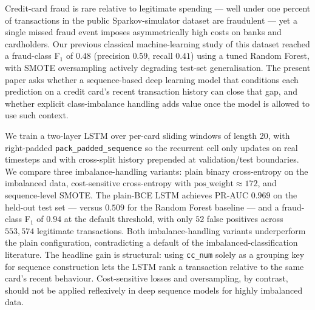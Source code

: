\documentclass[oneside,12pt,parskip=half,american,numbers=noenddot]{scrreprt}
\begin{document}
Credit-card fraud is rare relative to legitimate spending — well under one percent of transactions in the public Sparkov-simulator dataset are fraudulent — yet a single missed fraud event imposes asymmetrically high costs on banks and cardholders. Our previous classical machine-learning study of this dataset reached a fraud-class F\(_1\) of $0.48$ (precision $0.59$, recall $0.41$) using a tuned Random Forest, with SMOTE oversampling actively degrading test-set generalisation. The present paper asks whether a sequence-based deep learning model that conditions each prediction on a credit card's recent transaction history can close that gap, and whether explicit class-imbalance handling adds value once the model is allowed to use such context.

We train a two-layer LSTM over per-card sliding windows of length 20, with right-padded \texttt{pack\_padded\_sequence} so the recurrent cell only updates on real timesteps and with cross-split history prepended at validation/test boundaries. We compare three imbalance-handling variants: plain binary cross-entropy on the imbalanced data, cost-sensitive cross-entropy with $\text{pos\_weight} \approx 172$, and sequence-level SMOTE. The plain-BCE LSTM achieves PR-AUC $0.969$ on the held-out test set — versus $0.509$ for the Random Forest baseline — and a fraud-class F\(_1\) of $0.94$ at the default threshold, with only $52$ false positives across $553{,}574$ legitimate transactions. Both imbalance-handling variants underperform the plain configuration, contradicting a default of the imbalanced-classification literature. The headline gain is structural: using \texttt{cc\_num} solely as a grouping key for sequence construction lets the LSTM rank a transaction relative to the same card's recent behaviour. Cost-sensitive losses and oversampling, by contrast, should not be applied reflexively in deep sequence models for highly imbalanced data.

\newpage

\renewcommand{\contentsname}{\textbf{Table of Contents}}
\tableofcontents
\thispagestyle{frontmatter}
\newpage

\renewcommand{\listtablename}{\textbf{List of Tables}}
\listoftables
\thispagestyle{frontmatter}
\newpage

\renewcommand{\listfigurename}{\textbf{List of Figures}}
\listoffigures
\thispagestyle{frontmatter}
\newpage
\end{document}
